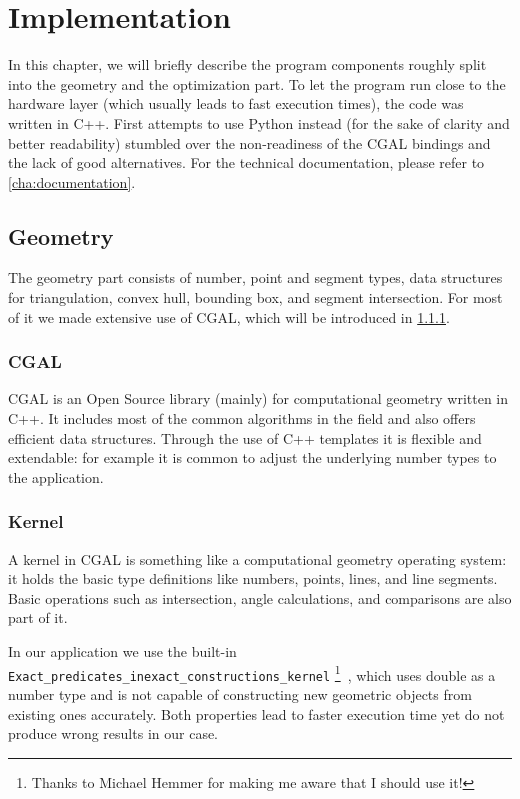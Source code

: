 \chapter{Implementation}
\label{cha:implementation}
In this chapter, we will briefly describe the program components
roughly split into the geometry and the optimization part.
To let the program run close to the hardware layer (which usually
leads to fast execution times), the code was written in C++. First
attempts to use Python instead (for the sake of clarity and better
readability) stumbled over the non-readiness of the \gls{CGAL} bindings and
the lack of good alternatives. For the technical documentation,
please refer to \cref{cha:documentation}.

\section{Geometry}
The geometry part consists of number, point and segment types, 
data structures for triangulation, convex hull, bounding box, 
and segment intersection. For most of it we
made extensive use of \gls{CGAL}, which will be introduced in \cref{sec:CGAL}.

\subsection{CGAL}
\label{sec:CGAL}
\gls{CGAL} \cite{cgal} is an Open Source library (mainly) for computational
geometry written in C++. It includes most of the common algorithms in
the field and also offers efficient data structures. Through the use
of C++ templates it is flexible and extendable: for example it is
common to adjust the underlying number types to the application.

\subsection{Kernel}
A kernel in \gls{CGAL} is something like a computational geometry operating
system: it holds the basic type definitions like numbers, points,
lines, and line segments. Basic operations such as intersection,
angle calculations, and comparisons are also part of it.

In our application we use the built-in 
\verb|Exact_predicates_inexact_constructions_kernel|%
\footnote{Thanks to Michael Hemmer for making me aware that I should
use it!}~\cite{cgal_manual_epick}, which uses double as a number type
and is not capable of constructing new geometric objects from existing
ones accurately. Both properties lead to faster execution time yet do 
not produce wrong results in our case.

